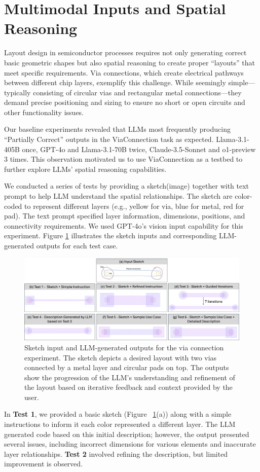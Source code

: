 \documentclass{article}
\begin{document}
\section{Multimodal Inputs and Spatial Reasoning}
Layout design in semiconductor processes requires not only generating correct basic geometric shapes but also spatial reasoning to create proper ``layouts'' that meet specific requirements. Via connections, which create electrical pathways between different chip layers, exemplify this challenge. While seemingly simple—typically consisting of circular vias and rectangular metal connections—they demand precise positioning and sizing to ensure no short or open circuits and other functionality issues.

Our baseline experiments revealed that LLMs most frequently producing ``Partially Correct'' outputs in the ViaConnection task as expected. Llama-3.1-405B once, GPT-4o and Llama-3.1-70B twice, Claude-3.5-Sonnet and o1-preview 3 times. This observation motivated us to use ViaConnection as a testbed to further explore LLMs' spatial reasoning capabilities.

We conducted a series of tests by providing a sketch(image) together with text prompt to help LLM understand the spatial relationships. The sketch are color-coded to represent different layers (e.g., yellow for via, blue for metal, red for pad). The text prompt specified layer information, dimensions, positions, and connectivity requirements. We used GPT-4o's vision input capability for this experiment. Figure \ref{fig:via_experiment} illustrates the sketch inputs and corresponding LLM-generated outputs for each test case.

\begin{figure}[!h]
\centering
\includegraphics[width=1\linewidth]{Figure1_v3.png}
\caption{Sketch input and LLM-generated outputs for the via connection experiment. The sketch depicts a desired layout with two vias connected by a metal layer and circular pads on top. The outputs show the progression of the LLM's understanding and refinement of the layout based on iterative feedback and context provided by the user.}
\label{fig:via_experiment}
\end{figure}
In \textbf{Test 1}, we provided a basic sketch (Figure ~\ref{fig:via_experiment}(a)) along with a simple instructions to inform it each color represented a different layer. The LLM generated code based on this initial description; however, the output presented several issues, including incorrect dimensions for various elements and inaccurate layer relationships. \textbf{Test 2} involved refining the description, but limited improvement is observed. 
\end{document}
